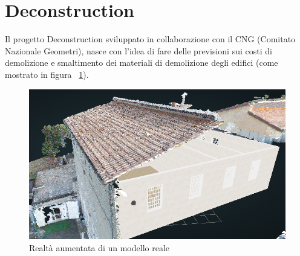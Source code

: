 \section{Deconstruction}
\label{sec:chapter_4_section_2}

Il progetto Deconstruction sviluppato in collaborazione con il CNG (Comitato Nazionale Geometri), nasce con l'idea di fare delle previsioni
sui costi di demolizione e smaltimento dei materiali di demolizione degli edifici (come mostrato in figura ~\ref{fig:augmented}).

\begin{figure}[htbp] %
   \centering
   \includegraphics[width=1\linewidth]{images/augmented}
   \caption{Realtà aumentata di un modello reale}
   \label{fig:augmented}
\end{figure}
\newpage

\newpage
